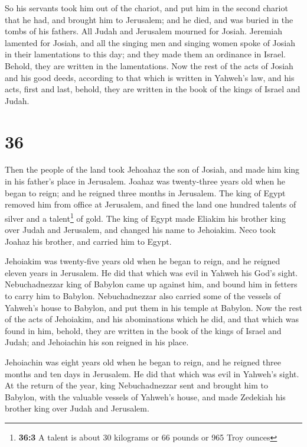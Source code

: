  So his servants took him out of the chariot, and put him
in the second chariot that he had, and brought him to Jerusalem; and he
died, and was buried in the tombs of his fathers. All Judah and
Jerusalem mourned for Josiah.  Jeremiah lamented for
Josiah, and all the singing men and singing women spoke of Josiah in
their lamentations to this day; and they made them an ordinance in
Israel. Behold, they are written in the lamentations. 
Now the rest of the acts of Josiah and his good deeds, according to that
which is written in Yahweh's law,  and his acts, first
and last, behold, they are written in the book of the kings of Israel
and Judah.

\hypertarget{section-35}{%
\section{36}\label{section-35}}

 Then the people of the land took Jehoahaz the son of
Josiah, and made him king in his father's place in Jerusalem.
 Joahaz was twenty-three years old when he began to reign;
and he reigned three months in Jerusalem.  The king of
Egypt removed him from office at Jerusalem, and fined the land one
hundred talents of silver and a talent\footnote{\textbf{36:3} A talent
  is about 30 kilograms or 66 pounds or 965 Troy ounces} of gold.
 The king of Egypt made Eliakim his brother king over
Judah and Jerusalem, and changed his name to Jehoiakim. Neco took Joahaz
his brother, and carried him to Egypt.

 Jehoiakim was twenty-five years old when he began to
reign, and he reigned eleven years in Jerusalem. He did that which was
evil in Yahweh his God's sight.  Nebuchadnezzar king of
Babylon came up against him, and bound him in fetters to carry him to
Babylon.  Nebuchadnezzar also carried some of the vessels
of Yahweh's house to Babylon, and put them in his temple at Babylon.
 Now the rest of the acts of Jehoiakim, and his
abominations which he did, and that which was found in him, behold, they
are written in the book of the kings of Israel and Judah; and Jehoiachin
his son reigned in his place.

 Jehoiachin was eight years old when he began to reign,
and he reigned three months and ten days in Jerusalem. He did that which
was evil in Yahweh's sight.  At the return of the year,
king Nebuchadnezzar sent and brought him to Babylon, with the valuable
vessels of Yahweh's house, and made Zedekiah his brother king over Judah
and Jerusalem.

